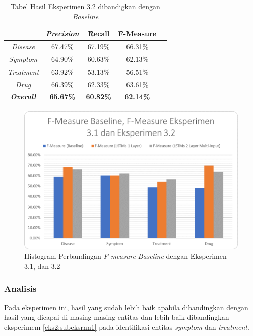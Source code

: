     \begin{table}
    	\centering
    	\caption{Tabel Hasil Eksperimen 3.2 dibandigkan dengan \textit{Baseline}}
    	\begin{tabular}{|c|c|c|c|c|}
    		\hline
    		& \textit{Precision} & \f{\f{Recall}} & \f{\f{F-Measure}} \\ \hline
    		\textit{Disease}      & 67.47\%             & 67.19\%        & 66.31\%           \\ \hline
    		\textit{Symptom}      & 64.90\%             & 60.63\%        & 62.13\%           \\ \hline
    		\textit{Treatment}    & 63.92\%             & 53.13\%        & 56.51\%           \\ \hline
    		\textit{Drug}		  & 66.39\%             & 62.33\%        & 63.61\%           \\ \hline
    		\textit{\textbf{Overall}}&\textbf{65.67\%}  & \textbf{60.82\%}& \textbf{62.14\%} \\ \hline
    	\end{tabular}
    	\label{table:owndict10}
    \end{table}
    
    \begin{figure}
    	\centering
    	\includegraphics[width=0.85\linewidth]{images/histogramrnnv2}
    	\caption{Histogram Perbandingan \textit{F-measure} \textit{Baseline} dengan Eksperimen 3.1, dan 3.2}
    	\label{fig:owndict10}
    \end{figure}

	\subsubsection{Analisis}
	Pada eksperimen ini, hasil yang sudah lebih baik apabila dibandingkan dengan hasil yang dicapai \cite{skripsiKakRadit} di masing-masing entitas dan lebih baik dibandingkan eksperimem \ref{eks2:subeksrnn1} pada identifikasi entitas \textit{symptom} dan \textit{treatment}.
